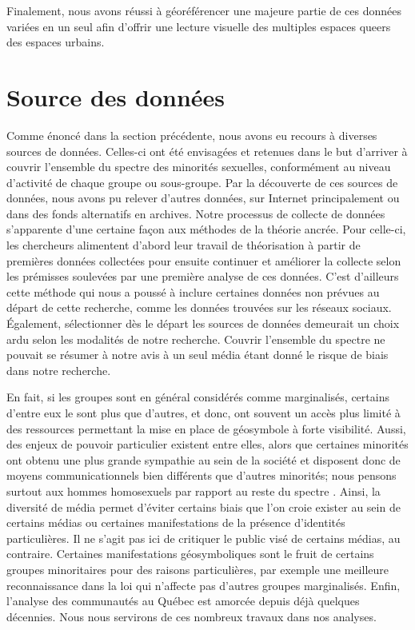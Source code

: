 Finalement, nous avons réussi à géoréférencer une majeure partie de ces données variées en un seul \sig{} afin d'offrir une lecture visuelle des multiples espaces queers des espaces urbains.

\section{Source des données}
\label{sec:source_des_donn_es}
Comme énoncé dans la section précédente, nous avons eu recours à diverses sources de données.
Celles-ci ont été envisagées et retenues dans le but d'arriver à couvrir l'ensemble du spectre des minorités sexuelles, conformément au niveau d'activité de chaque groupe ou sous-groupe.
Par la découverte de ces sources de données, nous avons pu relever d'autres données, sur Internet principalement ou dans des fonds alternatifs en archives.
Notre processus de collecte de données s'apparente d'une certaine façon aux méthodes de la théorie ancrée.
Pour celle-ci, les chercheurs alimentent d'abord leur travail de théorisation à partir de premières données collectées pour ensuite continuer et améliorer la collecte selon les prémisses soulevées par une première analyse de ces données.
C'est d'ailleurs cette méthode qui nous a poussé à inclure certaines données non prévues au départ de cette recherche, comme les données trouvées sur les réseaux sociaux.
Également, sélectionner dès le départ les sources de données demeurait un choix ardu selon les modalités de notre recherche.
Couvrir l'ensemble du spectre \lgbt{} ne pouvait se résumer à notre avis à un seul média étant donné le risque de biais dans notre recherche.

En fait, si les groupes \lgbt{} sont en général considérés comme marginalisés, certains d'entre eux le sont plus que d'autres, et donc, ont souvent un accès plus limité à des ressources permettant la mise en place de géosymbole à forte visibilité.
Aussi, des enjeux de pouvoir particulier existent entre elles, alors que certaines minorités ont obtenu une plus grande sympathie au sein de la société et disposent donc de moyens communicationnels bien différents que d'autres minorités; nous pensons surtout aux hommes homosexuels par rapport au reste du spectre \lgbt{}.
Ainsi, la diversité de média permet d'éviter certains biais que l'on croie exister au sein de certains médias ou certaines manifestations de la présence d'identités particulières.
Il ne s'agit pas ici de critiquer le public visé de certains médias, au contraire.
Certaines manifestations géosymboliques sont le fruit de certains groupes minoritaires pour des raisons particulières, par exemple une meilleure reconnaissance dans la loi qui n'affecte pas d'autres groupes marginalisés.
Enfin, l'analyse des communautés \lgbt{} au Québec est amorcée depuis déjà quelques décennies.
Nous nous servirons de ces nombreux travaux dans nos analyses.

